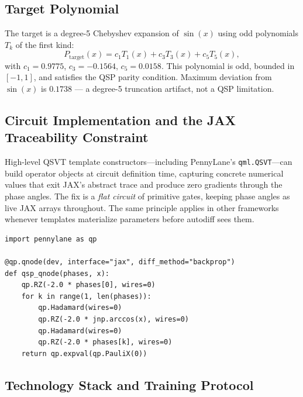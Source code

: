 \documentclass[11pt,a4paper]{article}
\begin{document}
\subsection{Target Polynomial}

The target is a degree-5 Chebyshev expansion of $\sin(x)$ using odd polynomials $T_k$ of the first kind:
\begin{equation}
  P_{\mathrm{target}}(x) = c_1 T_1(x) + c_3 T_3(x) + c_5 T_5(x),
\end{equation}
with $c_1=0.9775$, $c_3=-0.1564$, $c_5=0.0158$. This polynomial is odd, bounded in $[-1,1]$, and satisfies the QSP parity condition. Maximum deviation from $\sin(x)$ is $0.1738$ --- a degree-5 truncation artifact, not a QSP limitation.

\subsection{Circuit Implementation and the JAX Traceability Constraint}

High-level QSVT template constructors---including PennyLane's \texttt{qml.QSVT}---can build operator objects at circuit definition time, capturing concrete numerical values that exit JAX's abstract trace and produce zero gradients through the phase angles. The fix is a \emph{flat circuit} of primitive gates, keeping phase angles as live JAX arrays throughout. The same principle applies in other frameworks whenever templates materialize parameters before autodiff sees them.

\begin{lstlisting}[caption={Reference flat-circuit QSP implementation (PennyLane + JAX). The structure is portable; only the gate API differs in Qiskit, Cirq, or TFQ.}, label={lst:circuit}]
import pennylane as qp

@qp.qnode(dev, interface="jax", diff_method="backprop")
def qsp_qnode(phases, x):
    qp.RZ(-2.0 * phases[0], wires=0)
    for k in range(1, len(phases)):
        qp.Hadamard(wires=0)
        qp.RZ(-2.0 * jnp.arccos(x), wires=0)
        qp.Hadamard(wires=0)
        qp.RZ(-2.0 * phases[k], wires=0)
    return qp.expval(qp.PauliX(0))
\end{lstlisting}

\subsection{Technology Stack and Training Protocol}
\end{document}
